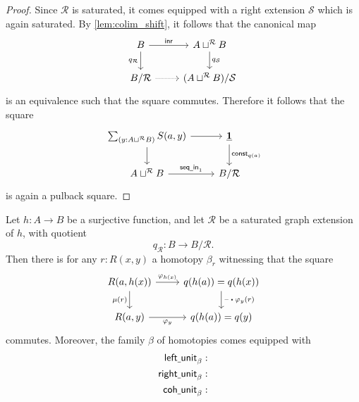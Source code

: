 \begin{proof}
Since $\mathcal{R}$ is saturated, it comes equipped with a right extension $\mathcal{S}$ which is again saturated. 
By \cref{lem:colim_shift}, it follows that the canonical map
\begin{equation*}
\begin{tikzcd}
B \arrow[d,swap,"q_{\mathcal{R}}"] \arrow[r,"\inr"] & A\sqcup^{\mathcal{R}} B \arrow[d,"q_{\mathcal{S}}"] \\
B/\mathcal{R} \arrow[r,densely dotted] & (A\sqcup^{\mathcal{R}} B)/\mathcal{S}
\end{tikzcd}
\end{equation*}
is an equivalence such that the square commutes. Therefore it follows that the square
\begin{equation*}
\begin{tikzcd}
\sm{y:A\sqcup^{\mathcal{R}} B} S(a,y) \arrow[d] \arrow[r] & \unit \arrow[d,"\mathsf{const}_{q(a)}"] \\
A\sqcup^{\mathcal{R}} B \arrow[r,"\mathsf{seq\usc{}in}_1"] & B/\mathcal{R}
\end{tikzcd}
\end{equation*}
is again a pulback square.
\end{proof}

\begin{cor}
Let $h:A\to B$ be a surjective function, and let $\mathcal{R}$ be a saturated graph extension of $h$, with quotient
\begin{equation*}
q_{\mathcal{R}}:B\to B/\mathcal{R}.
\end{equation*}
Then there is for any $r:R(x,y)$ a homotopy $\beta_r$ witnessing that the square
\begin{equation*}
\begin{tikzcd}
R(a,h(x)) \arrow[d,swap,"\mu(r)"] \arrow[r,"\varphi_{h(x)}"] & q(h(a))=q(h(x)) \arrow[d,"\ct{\blank}{\varphi_y(r)}"] \\
R(a,y) \arrow[r,swap,"\varphi_y"] & q(h(a))=q(y)
\end{tikzcd}
\end{equation*}
commutes. Moreover, the family $\beta$ of homotopies comes equipped with
\begin{align*}
\mathsf{left\underline{\ }{}unit}_\beta & : \\
\mathsf{right\underline{\ }{}unit}_\beta & : \\
\mathsf{coh\underline{\ }{}unit}_\beta & : 
\end{align*}
\end{cor}


